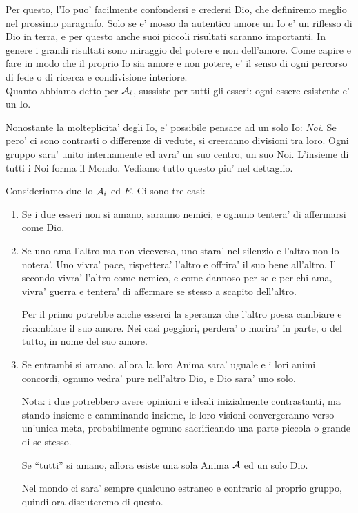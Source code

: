     Per questo, l'Io puo' facilmente confondersi e credersi Dio, che definiremo meglio nel prossimo paragrafo. Solo se e' mosso da autentico amore un Io e' un riflesso di Dio in terra, e per questo anche suoi piccoli risultati saranno importanti. In genere i grandi risultati sono miraggio del potere e non dell'amore. Come capire e fare in modo che il proprio Io sia amore e non potere, e' il senso di ogni percorso di fede o di ricerca e condivisione interiore. \\

    Quanto abbiamo detto per $\mathcal{A}_i$, sussiste per tutti gli esseri: ogni essere esistente e' un Io.

    Nonostante la molteplicita' degli Io, e' possibile pensare ad un solo Io: \emph{Noi}. Se pero' ci sono contrasti o differenze di vedute, si creeranno divisioni tra loro. Ogni gruppo sara' unito internamente ed avra' un suo centro, un suo Noi. L'insieme di tutti i Noi forma il Mondo. Vediamo tutto questo piu' nel dettaglio.

    Consideriamo due Io $\mathcal{A}_i$ ed $E$. Ci sono tre casi:

    \begin{enumerate}

        \item Se i due esseri non si amano, saranno nemici, e ognuno tentera' di affermarsi come Dio.

        \item Se uno ama l'altro ma non viceversa, uno stara' nel silenzio e l'altro non lo notera'. Uno vivra' pace, rispettera' l'altro e offrira' il suo bene all'altro. Il secondo vivra' l'altro come nemico, e come dannoso per se e per chi ama, vivra' guerra e tentera' di affermare se stesso a scapito dell'altro.
            
            Per il primo potrebbe anche esserci la speranza che l'altro possa cambiare e ricambiare il suo amore. Nei casi peggiori, perdera' o morira' in parte, o del tutto, in nome del suo amore.

        \item Se entrambi si amano, allora la loro Anima sara' uguale e i lori animi concordi, ognuno vedra' pure nell'altro Dio, e Dio sara' uno solo.

                Nota: i due potrebbero avere opinioni e ideali inizialmente contrastanti, ma stando insieme e camminando insieme, le loro visioni convergeranno verso un'unica meta, probabilmente ognuno sacrificando una parte piccola o grande di se stesso.

                Se ``tutti'' si amano, allora esiste una sola Anima $\mathcal{A}$ ed un solo Dio.

                Nel mondo ci sara' sempre qualcuno estraneo e contrario al proprio gruppo, quindi ora discuteremo di questo.
    \end{enumerate}

